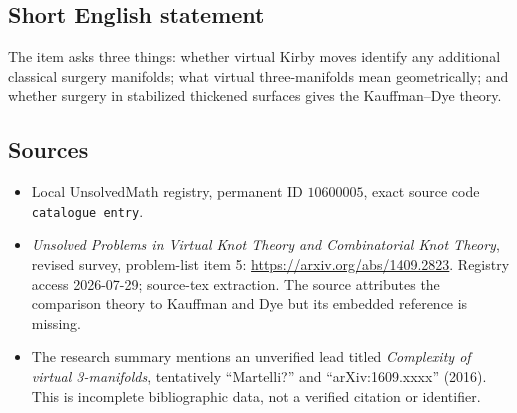\documentclass[11pt]{article}
\begin{document}
\subsection{Short English statement}
The item asks three things: whether virtual Kirby moves identify any additional classical surgery manifolds; what virtual three-manifolds mean geometrically; and whether surgery in stabilized thickened surfaces gives the Kauffman--Dye theory.
\subsection{Sources}
\begin{itemize}
\item Local UnsolvedMath registry, permanent ID \(10600005\), exact source code \texttt{catalogue entry}.
\item \emph{Unsolved Problems in Virtual Knot Theory and Combinatorial Knot Theory}, revised survey, problem-list item 5: \url{https://arxiv.org/abs/1409.2823}. Registry access 2026-07-29; source-tex extraction. The source attributes the comparison theory to Kauffman and Dye but its embedded reference is missing.
\item The research summary mentions an unverified lead titled \emph{Complexity of virtual 3-manifolds}, tentatively ``Martelli?'' and ``arXiv:1609.xxxx'' (2016). This is incomplete bibliographic data, not a verified citation or identifier.
\end{itemize}
\end{document}
